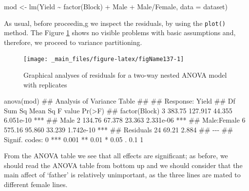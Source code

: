 \documentclass[a4paper,12pt,oneside]{book}
\newenvironment{Shaded}{\begin{snugshade}}{\end{snugshade}}
\newcommand{\SpecialCharTok}[1]{#1}
\newcommand{\DocumentationTok}[1]{#1}
\newcommand{\OtherTok}[1]{#1}
\newcommand{\FunctionTok}[1]{#1}
\newcommand{\AttributeTok}[1]{#1}
\newcommand{\NormalTok}[1]{#1}
\begin{document}
\begin{Shaded}
\begin{Highlighting}[]
\NormalTok{mod }\OtherTok{\textless{}{-}} \FunctionTok{lm}\NormalTok{(Yield }\SpecialCharTok{\textasciitilde{}} \FunctionTok{factor}\NormalTok{(Block) }\SpecialCharTok{+}\NormalTok{ Male }\SpecialCharTok{+}\NormalTok{ Male}\SpecialCharTok{/}\NormalTok{Female, }\AttributeTok{data =}\NormalTok{ dataset)}
\end{Highlighting}
\end{Shaded}

\normalsize

As usual, before proceedin,g we inspect the residuals, by using the \texttt{plot()} method. The Figure \ref{fig:figName137} shows no visible problems with basic assumptions and, therefore, we proceed to variance partitioning.

\begin{figure}

{\centering \texttt{[image: \_main\_files/figure-latex/figName137-1]} 

}

\caption{Graphical analyses of residuals for a two-way nested ANOVA model with replicates}\label{fig:figName137}
\end{figure}

\vspace{12pt}

\begin{Shaded}
\begin{Highlighting}[]
\FunctionTok{anova}\NormalTok{(mod)}
\DocumentationTok{\#\# Analysis of Variance Table}
\DocumentationTok{\#\# }
\DocumentationTok{\#\# Response: Yield}
\DocumentationTok{\#\#               Df Sum Sq Mean Sq F value    Pr(\textgreater{}F)    }
\DocumentationTok{\#\# factor(Block)  3 383.75 127.917  44.355 6.051e{-}10 ***}
\DocumentationTok{\#\# Male           2 134.76  67.378  23.363 2.331e{-}06 ***}
\DocumentationTok{\#\# Male:Female    6 575.16  95.860  33.239 1.742e{-}10 ***}
\DocumentationTok{\#\# Residuals     24  69.21   2.884                      }
\DocumentationTok{\#\# {-}{-}{-}}
\DocumentationTok{\#\# Signif. codes:  0 \textquotesingle{}***\textquotesingle{} 0.001 \textquotesingle{}**\textquotesingle{} 0.01 \textquotesingle{}*\textquotesingle{} 0.05 \textquotesingle{}.\textquotesingle{} 0.1 \textquotesingle{} \textquotesingle{} 1}
\end{Highlighting}
\end{Shaded}

From the ANOVA table we see that all effects are significant; as before, we should read the ANOVA table from bottom up and we should consider that the main affect of `father' is relatively unimportant, as the three lines are mated to different female lines.
\end{document}
